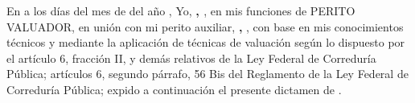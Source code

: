 En \lugarInforme{} a los \numberstringnum{\diainforme} d\'ias del mes de \monthname[\mesinforme] del a\~no \numberstringnum{\annoinforme}, Yo, \textbf{\textcolor{principal}{\nombrePerito, \descripcionPerito}}, en mis funciones de PERITO VALUADOR, en uni\'on con mi perito auxiliar, \textcolor{principal}{\textbf{\nombreAuxiliar, \descripcionAuxiliar}}, con base en mis conocimientos t\'ecnicos y mediante la aplicaci\'on de t\'ecnicas de valuaci\'on seg\'un lo dispuesto por el art\'iculo 6, fracci\'on II, y dem\'as relativos de la Ley Federal de Corredur\'ia P\'ublica; art\'iculos 6, segundo p\'arrafo, 56 Bis del Reglamento de la Ley Federal de Corredur\'ia P\'ublica; expido a continuaci\'on el presente dictamen de \tipoAvaluo.\\




